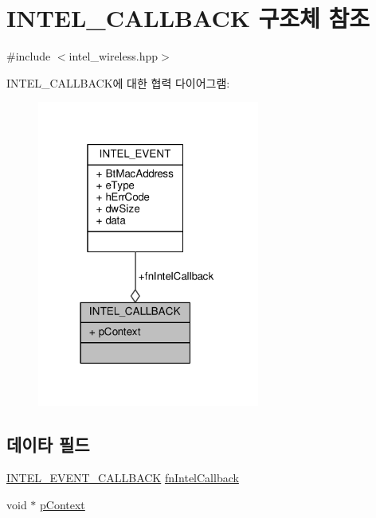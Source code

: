 \hypertarget{struct_i_n_t_e_l___c_a_l_l_b_a_c_k}{}\section{I\+N\+T\+E\+L\+\_\+\+C\+A\+L\+L\+B\+A\+CK 구조체 참조}
\label{struct_i_n_t_e_l___c_a_l_l_b_a_c_k}


{\ttfamily \#include $<$intel\+\_\+wireless.\+hpp$>$}



I\+N\+T\+E\+L\+\_\+\+C\+A\+L\+L\+B\+A\+C\+K에 대한 협력 다이어그램\+:
\nopagebreak
\begin{figure}[H]
\begin{center}
\leavevmode
\includegraphics[width=207pt]{struct_i_n_t_e_l___c_a_l_l_b_a_c_k__coll__graph}
\end{center}
\end{figure}
\subsection*{데이타 필드}
\begin{DoxyCompactItemize}
\item 
\hyperlink{intel__wireless_8hpp_a0b8b45875243496f41e8bea13e81b907}{I\+N\+T\+E\+L\+\_\+\+E\+V\+E\+N\+T\+\_\+\+C\+A\+L\+L\+B\+A\+CK} \hyperlink{struct_i_n_t_e_l___c_a_l_l_b_a_c_k_a34ed9821386ec2f385eedbb1b9e87755}{fn\+Intel\+Callback}
\item 
void $\ast$ \hyperlink{struct_i_n_t_e_l___c_a_l_l_b_a_c_k_a102e5f449fe313bf3edfe0c51fd3c746}{p\+Context}
\end{DoxyCompactItemize}


